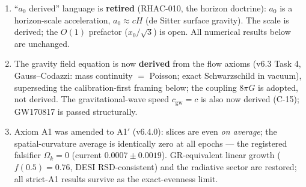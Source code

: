 \documentclass[12pt]{article}
\begin{document}
\begin{center}
{{\begin{enumerate}
($\Omega_m = R_H/r_p$) is not derivable as a law; the ``$\Omega_m$ derived''
language is retired.
\item ``$a_0$ derived'' language is \textbf{retired} (RHAC-010, the horizon
doctrine): $a_0$ is a horizon-scale acceleration, $a_0 \approx cH$ (de Sitter
surface gravity). The scale is derived; the $O(1)$ prefactor
($x_0/\sqrt{3}$) is open. All numerical results below are unchanged.
\item The gravity field equation is now \textbf{derived} from the flow axioms
(v6.3 Task 4, Gauss--Codazzi: mass continuity $=$ Poisson; exact
Schwarzschild in vacuum), superseding the calibration-first framing below;
the coupling $8\pi G$ is adopted, not derived. The gravitational-wave speed
$c_\text{gw} = c$ is also now derived (C-15); GW170817 is passed structurally.
\item Axiom A1 was amended to A1$'$ (v6.4.0): slices are even \emph{on
average}; the spatial-curvature average is identically zero at all epochs ---
the registered falsifier $\Omega_k = 0$ (current $0.0007 \pm 0.0019$).
GR-equivalent linear growth ($f(0.5) = 0.76$, DESI RSD-consistent) and the
radiative sector are restored; all strict-A1 results survive as the
exact-evenness limit.
\end{enumerate}
}}
\end{center}
\end{document}
